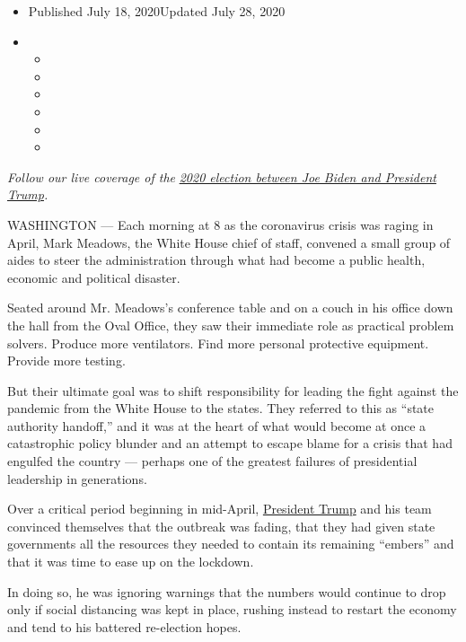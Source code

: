 \begin{itemize}
\item
  Published July 18, 2020Updated July 28, 2020
\item
  \begin{itemize}
  \item
  \item
  \item
  \item
  \item
  \item
  \end{itemize}
\end{itemize}

\emph{Follow our live coverage of the}
\href{https://www.nytimes3xbfgragh.onion/2020/07/27/us/elections/biden-vs-trump.html}{\emph{2020
election between Joe Biden and President Trump}}\emph{.}

WASHINGTON --- Each morning at 8 as the coronavirus crisis was raging in
April, Mark Meadows, the White House chief of staff, convened a small
group of aides to steer the administration through what had become a
public health, economic and political disaster.

Seated around Mr. Meadows's conference table and on a couch in his
office down the hall from the Oval Office, they saw their immediate role
as practical problem solvers. Produce more ventilators. Find more
personal protective equipment. Provide more testing.

But their ultimate goal was to shift responsibility for leading the
fight against the pandemic from the White House to the states. They
referred to this as ``state authority handoff,'' and it was at the heart
of what would become at once a catastrophic policy blunder and an
attempt to escape blame for a crisis that had engulfed the country ---
perhaps one of the greatest failures of presidential leadership in
generations.

Over a critical period beginning in mid-April,
\href{https://www.nytimes3xbfgragh.onion/2020/07/28/us/politics/donald-fred-trump.html}{President
Trump} and his team convinced themselves that the outbreak was fading,
that they had given state governments all the resources they needed to
contain its remaining ``embers'' and that it was time to ease up on the
lockdown.

In doing so, he was ignoring warnings that the numbers would continue to
drop only if social distancing was kept in place, rushing instead to
restart the economy and tend to his battered re-election hopes.

